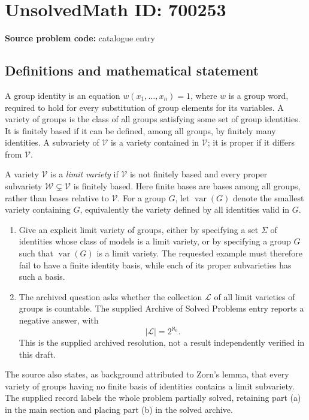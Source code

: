\documentclass[11pt]{article}
\begin{document}
\section*{UnsolvedMath ID: 700253}
\textbf{Source problem code:} catalogue entry
\subsection{Definitions and mathematical statement}
A group identity is an equation \(w(x_1,\ldots,x_n)=1\), where \(w\) is a group word, required to hold for every substitution of group elements for its variables. A variety of groups is the class of all groups satisfying some set of group identities. It is finitely based if it can be defined, among all groups, by finitely many identities. A subvariety of \(\mathcal V\) is a variety contained in \(\mathcal V\); it is proper if it differs from \(\mathcal V\).

A variety \(\mathcal V\) is a \emph{limit variety} if \(\mathcal V\) is not finitely based and every proper subvariety \(\mathcal W\subsetneq\mathcal V\) is finitely based. Here finite bases are bases among all groups, rather than bases relative to \(\mathcal V\). For a group \(G\), let \(\operatorname{var}(G)\) denote the smallest variety containing \(G\), equivalently the variety defined by all identities valid in \(G\).

\begin{enumerate}
\item[(a)] Give an explicit limit variety of groups, either by specifying a set \(\Sigma\) of identities whose class of models is a limit variety, or by specifying a group \(G\) such that \(\operatorname{var}(G)\) is a limit variety. The requested example must therefore fail to have a finite identity basis, while each of its proper subvarieties has such a basis.
\item[(b)] The archived question asks whether the collection \(\mathcal L\) of all limit varieties of groups is countable. The supplied Archive of Solved Problems entry reports a negative answer, with
\[
|\mathcal L|=2^{\aleph_0}.
\]
This is the supplied archived resolution, not a result independently verified in this draft.
\end{enumerate}

The source also states, as background attributed to Zorn's lemma, that every variety of groups having no finite basis of identities contains a limit subvariety. The supplied record labels the whole problem partially solved, retaining part (a) in the main section and placing part (b) in the solved archive.
\end{document}
